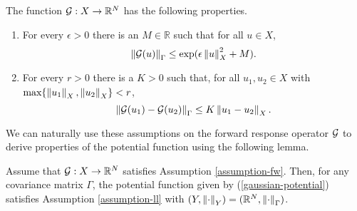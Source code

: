 \begin{assumption}\label{assumption-fw}
  The function $\mathcal{G} : X \rightarrow \mathbb{R}^N$ has the following properties.

  \begin{enumerate}
  \item For every $\epsilon > 0$ there is an $M \in \mathbb{R}$ such that for all $u \in X$,
    \begin{equation*}
      \left\lVert\mathcal{G}(u)\right\rVert_\Gamma \le \exp(\epsilon \left\lVert u\right\rVert_X^2 + M).
    \end{equation*}
  \item For every $r > 0$ there is a $K > 0$ such that, for all $u_1, u_2 \in X$ with $\text{max}\{\left\lVert u_1\right\rVert_X, \left\lVert u_2\right\rVert_X\} < r$,
    \begin{equation*}
      \left\lVert\mathcal{G}(u_1) - \mathcal{G}(u_2)\right\rVert_\Gamma \le K\left\lVert u_1 - u_2\right\rVert_X.
    \end{equation*}
  \end{enumerate}
\end{assumption}

We can naturally use these assumptions on the forward response operator $\mathcal{G}$ to derive properties of the potential function using the following lemma.

\begin{lemma} \label{fw-implies-ll}
  Assume that $\mathcal{G}  : X \rightarrow \mathbb{R}^N$ satisfies Assumption \ref{assumption-fw}. Then, for any covariance matrix $\Gamma$, the potential function given by (\ref{gaussian-potential}) satisfies Assumption \ref{assumption-ll} with $(Y, \left\lVert\cdot\right\rVert_Y) = (\mathbb{R}^N, \left\lVert\cdot\right\rVert_\Gamma)$.
\end{lemma}

